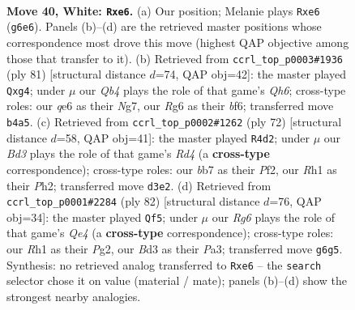 \documentclass[11pt]{article}
\begin{document}
\clearpage

\begin{figure}[p]\centering
\begin{subfigure}{0.46\textwidth}\centering
\resizebox{\linewidth}{!}{%
\newchessgame
\chessboard[
  setfen={7r/1b3k2/4q1R1/r7/1Q5p/3B3P/1p4P1/6KR w - - 0 40},
  showmover=false,
  pgfstyle=straightmove, color=movearrow, markmove={g6-e6}
]}
\caption{}
\end{subfigure}\hfill
\begin{subfigure}{0.46\textwidth}\centering
\resizebox{\linewidth}{!}{%
\newchessgame
\chessboard[
  setfen={4r1k1/5pn1/5Bp1/p3P3/P5R1/1N5q/3Q1K2/8 b - - 0 41},
  showmover=false,
  pgfstyle=straightmove, color=movearrow, markmove={h3-g4}
]}
\caption{}
\end{subfigure}
\\[4pt]
\begin{subfigure}{0.46\textwidth}\centering
\resizebox{\linewidth}{!}{%
\newchessgame
\chessboard[
  setfen={5r2/p3b1Q1/4k1p1/1p2n3/3R4/8/2q2PPP/3R2K1 w - - 0 37},
  showmover=false,
  pgfstyle=straightmove, color=movearrow, markmove={d4-d2}
]}
\caption{}
\end{subfigure}\hfill
\begin{subfigure}{0.46\textwidth}\centering
\resizebox{\linewidth}{!}{%
\newchessgame
\chessboard[
  setfen={8/p6k/2q3rp/4p3/4Qp2/P4R2/5PP1/6K1 w - - 4 42},
  showmover=false,
  pgfstyle=straightmove, color=movearrow, markmove={e4-f5}
]}
\caption{}
\end{subfigure}
\caption{\textbf{Move 40, White: \texttt{Rxe6}.} (a) Our position; Melanie plays \texttt{Rxe6} (\texttt{g6e6}). Panels (b)--(d) are the retrieved master positions whose correspondence most drove this move (highest QAP objective among those that transfer to it). (b) Retrieved from \texttt{ccrl\_top\_p0003\#1936} (ply 81) [structural distance $d$=74, QAP obj=42]: the master played \texttt{Qxg4}; under $\mu$ our \emph{Qb4} plays the role of that game's \emph{Qh6}; cross-type roles: our \emph{q}e6 as their \emph{N}g7, our \emph{R}g6 as their \emph{b}f6; transferred move \texttt{b4a5}. (c) Retrieved from \texttt{ccrl\_top\_p0002\#1262} (ply 72) [structural distance $d$=58, QAP obj=41]: the master played \texttt{R4d2}; under $\mu$ our \emph{Bd3} plays the role of that game's \emph{Rd4} (a \textbf{cross-type} correspondence); cross-type roles: our \emph{b}b7 as their \emph{P}f2, our \emph{R}h1 as their \emph{P}h2; transferred move \texttt{d3e2}. (d) Retrieved from \texttt{ccrl\_top\_p0001\#2284} (ply 82) [structural distance $d$=76, QAP obj=34]: the master played \texttt{Qf5}; under $\mu$ our \emph{Rg6} plays the role of that game's \emph{Qe4} (a \textbf{cross-type} correspondence); cross-type roles: our \emph{R}h1 as their \emph{P}g2, our \emph{B}d3 as their \emph{P}a3; transferred move \texttt{g6g5}. Synthesis: no retrieved analog transferred to \texttt{Rxe6} -- the \texttt{search} selector chose it on value (material / mate); panels (b)--(d) show the strongest nearby analogies.}
\label{fig:thought-m78}
\end{figure}
\end{document}
